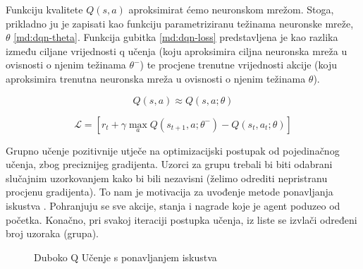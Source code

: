 Funkciju kvalitete $Q(s, a)$ aproksimirat ćemo neuronskom mrežom. Stoga, prikladno ju je zapisati kao funkciju parametriziranu težinama neuronske mreže, $\theta$ \ref{md:dqn-theta}. Funkcija gubitka \ref{md:dqn-loss} predstavljena je kao razlika između ciljane vrijednosti q učenja (koju aproksimira ciljna neuronska mreža u ovisnosti o njenim težinama $\theta^-$) te procjene trenutne vrijednosti akcije (koju aproksimira trenutna neuronska mreža u ovisnosti o njenim težinama $\theta$).

\begin{equation}
    \label{md:dqn-theta}
    Q(s, a) \approx Q(s, a; \theta)
\end{equation}

\begin{equation}
    \label{md:dqn-loss}
    \mathcal{L} = \left[ r_t + \gamma \max_a Q(s_{t+1}, a; \theta^-) - Q(s_t, a_t; \theta) \right]
\end{equation}

Grupno  učenje pozitivnije utječe na optimizacijski postupak od pojedinačnog učenja, zbog preciznijeg gradijenta. Uzorci za grupu trebali bi biti odabrani slučajnim uzorkovanjem kako bi bili nezavisni (želimo odrediti nepristranu procjenu gradijenta). To nam je motivacija za uvođenje metode ponavljanja iskustva . Pohranjuju se sve akcije, stanja i nagrade koje je agent poduzeo od početka. Konačno, pri svakoj iteraciji postupka učenja, iz liste se izvlači određeni broj uzoraka (grupa).


\begin{figure}[H]
    \centering
    \caption{Duboko Q Učenje s ponavljanjem iskustva}
    \label{fig:dql-algorithm}
\end{figure}

